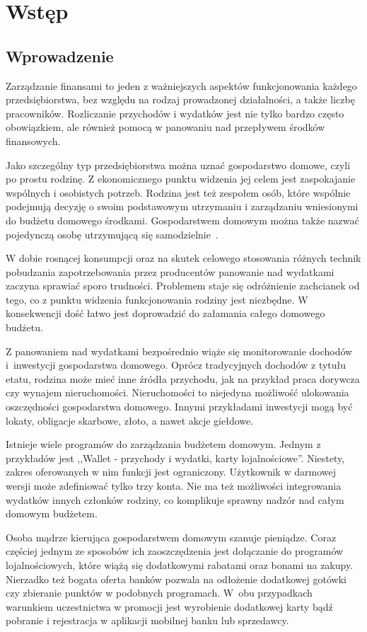 \chapter{Wstęp}
\label{chap:wstep}
\section{Wprowadzenie}
\label{sec:wprowadzenie}
Zarządzanie finansami to jeden z ważniejszych aspektów funkcjonowania każdego przedsiębiorstwa, bez względu na rodzaj prowadzonej działalności, a także liczbę pracowników. Rozliczanie przychodów i wydatków jest nie tylko bardzo często obowiązkiem, ale również pomocą w panowaniu nad przepływem środków finansowych. 

Jako szczególny typ przedsiębiorstwa można uznać gospodarstwo domowe, czyli po prostu rodzinę. Z ekonomicznego punktu widzenia jej celem jest zaspokajanie wspólnych i osobistych potrzeb. Rodzina jest też zespołem osób, które wspólnie podejmują decyzję o swoim podstawowym utrzymaniu i zarządzaniu wniesionymi do budżetu domowego środkami. Gospodarstwem domowym można także nazwać pojedynczą osobę utrzymującą się samodzielnie~\cite{gospodarstwo-domowe}.

W dobie rosnącej konsumpcji oraz na skutek celowego stosowania różnych technik pobudzania zapotrzebowania przez producentów panowanie nad wydatkami zaczyna sprawiać sporo trudności. Problemem staje się odróżnienie zachcianek od tego, co z punktu widzenia funkcjonowania rodziny jest niezbędne. W konsekwencji dość łatwo jest doprowadzić do załamania całego domowego budżetu.

Z panowaniem nad wydatkami bezpośrednio wiąże się monitorowanie dochodów i~inwestycji gospodarstwa domowego. Oprócz tradycyjnych dochodów z tytułu etatu, rodzina może mieć inne źródła przychodu, jak na przykład praca dorywcza czy wynajem nieruchomości. Nieruchomości to niejedyna możliwość ulokowania oszczędności gospodarstwa domowego. Innymi przykładami inwestycji mogą być lokaty, obligacje skarbowe, złoto, a nawet akcje giełdowe.

Istnieje wiele programów do zarządzania budżetem domowym. Jednym z przykładów jest ,,Wallet - przychody i wydatki, karty lojalnościowe''. Niestety, zakres oferowanych w nim funkcji jest ograniczony. Użytkownik w darmowej wersji może zdefiniować tylko trzy konta. Nie ma też możliwości integrowania wydatków innych członków rodziny, co komplikuje sprawny nadzór nad całym domowym budżetem.

Osoba mądrze kierująca gospodarstwem domowym szanuje pieniądze. Coraz częściej jednym ze sposobów ich zaoszczędzenia jest dołączanie do programów lojalnościowych, które wiążą się dodatkowymi rabatami oraz bonami na zakupy. Nierzadko też bogata oferta banków pozwala na odłożenie dodatkowej gotówki czy zbieranie punktów w podobnych programach. W~obu przypadkach warunkiem uczestnictwa w promocji jest wyrobienie dodatkowej karty bądź pobranie i rejestracja w aplikacji mobilnej banku lub sprzedawcy.

